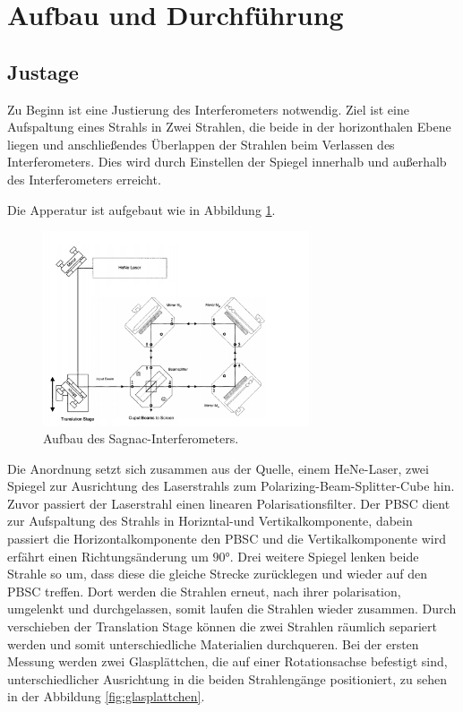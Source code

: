 \section{Aufbau und Durchführung}
\label{sec:Durchführung}

\subsection{Justage}
Zu Beginn ist eine Justierung des Interferometers notwendig.
Ziel ist eine Aufspaltung eines Strahls in Zwei Strahlen, die beide in
der horizonthalen Ebene liegen und anschließendes Überlappen der Strahlen
beim Verlassen des Interferometers. Dies wird durch Einstellen der
Spiegel innerhalb und außerhalb des Interferometers erreicht.

Die  Apperatur ist aufgebaut wie in Abbildung \ref{fig:apparat}.
\begin{figure}
    \centering
    \includegraphics[width=0.7\textwidth]{Apperatur.PNG}
    \caption{Aufbau des Sagnac-Interferometers.\cite{skript}}
    \label{fig:apparat}
\end{figure}
Die Anordnung setzt sich zusammen aus der Quelle, einem HeNe-Laser, zwei
Spiegel zur Ausrichtung des Laserstrahls zum Polarizing-Beam-Splitter-Cube hin.
Zuvor passiert der Laserstrahl einen linearen Polarisationsfilter.
Der PBSC dient zur Aufspaltung des Strahls in Horizntal-und Vertikalkomponente,
dabein passiert die Horizontalkomponente den PBSC und die Vertikalkomponente wird
erfährt einen Richtungsänderung um $90\si{\degree}$. Drei weitere Spiegel lenken
beide Strahle so um, dass diese die gleiche Strecke zurücklegen und wieder auf
den PBSC treffen. Dort werden die Strahlen erneut, nach ihrer polarisation,
umgelenkt und durchgelassen, somit laufen die Strahlen wieder zusammen.
Durch verschieben der Translation Stage können die zwei Strahlen räumlich separiert
werden und somit unterschiedliche Materialien durchqueren.
Bei der ersten Messung werden zwei Glasplättchen, die auf einer Rotationsachse
befestigt sind, unterschiedlicher
Ausrichtung in die beiden Strahlengänge positioniert, zu sehen in der Abbildung
\ref{fig:glasplattchen}.

